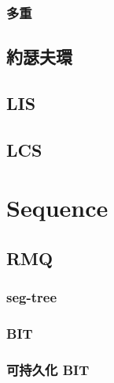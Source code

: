 \subsubsection{多重}


\subsection{約瑟夫環}


\subsection{LIS}


\subsection{LCS}


\section{Sequence}

\subsection{RMQ}
\subsubsection{seg-tree}


\subsubsection{BIT}


\subsubsection{可持久化 BIT}


% 

